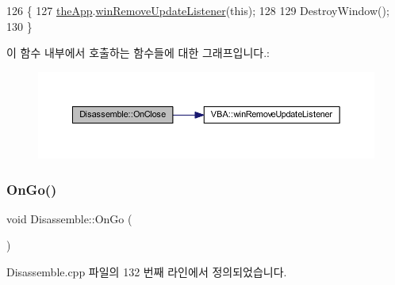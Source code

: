 \begin{DoxyCode}
126 \{
127   \mbox{\hyperlink{_v_b_a_8cpp_a8095a9d06b37a7efe3723f3218ad8fb3}{theApp}}.\mbox{\hyperlink{class_v_b_a_a2d31a0656df2230310aa8dc9e3a735d3}{winRemoveUpdateListener}}(\textcolor{keyword}{this});
128   
129   DestroyWindow();
130 \}
\end{DoxyCode}
이 함수 내부에서 호출하는 함수들에 대한 그래프입니다.\+:
\nopagebreak
\begin{figure}[H]
\begin{center}
\leavevmode
\includegraphics[width=350pt]{class_disassemble_a8f239c5117018f44ee0847b530a9eee1_cgraph}
\end{center}
\end{figure}
\mbox{\label{class_disassemble_add1cb356f3605cc46f9c83f29473db24}} 
\subsubsection{\texorpdfstring{On\+Go()}{OnGo()}}
{\footnotesize\ttfamily void Disassemble\+::\+On\+Go (\begin{DoxyParamCaption}{ }\end{DoxyParamCaption})\hspace{0.3cm}{\ttfamily [protected]}}



Disassemble.\+cpp 파일의 132 번째 라인에서 정의되었습니다.


